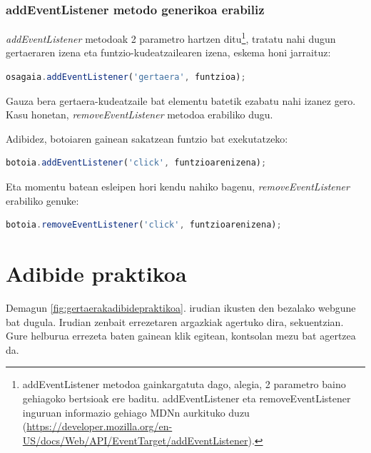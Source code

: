 \subsubsection{addEventListener metodo generikoa erabiliz}

\textit{addEventListener} metodoak 2 parametro hartzen ditu\footnote{addEventListener metodoa gainkargatuta dago, alegia, 2 parametro baino gehiagoko bertsioak ere baditu. addEventListener eta removeEventListener inguruan informazio gehiago MDNn aurkituko duzu (\href{https://developer.mozilla.org/en-US/docs/Web/API/EventTarget/addEventListener}{https://developer.mozilla.org/en-US/docs/Web/API/EventTarget/addEventListener}).}, tratatu nahi dugun gertaeraren izena eta funtzio-kudeatzailearen izena, eskema honi jarraituz:

\begin{lstlisting}[language=JavaScript,numbers=none]
osagaia.addEventListener('gertaera', funtzioa);
\end{lstlisting}

Gauza bera gertaera-kudeatzaile bat elementu batetik ezabatu nahi izanez gero. Kasu honetan, \textit{removeEventListener} metodoa erabiliko dugu.

Adibidez, botoiaren gainean sakatzean funtzio bat exekutatzeko:

\begin{lstlisting}[language=JavaScript,numbers=none]
botoia.addEventListener('click', funtzioarenizena);
\end{lstlisting}

Eta momentu batean esleipen hori kendu nahiko bagenu, \textit{removeEventListener} erabiliko genuke:

\begin{lstlisting}[language=JavaScript,numbers=none]
botoia.removeEventListener('click', funtzioarenizena);
\end{lstlisting}


\section{Adibide praktikoa}

Demagun \ref{fig:gertaerakadibidepraktikoa}. irudian ikusten den bezalako webgune bat dugula. Irudian zenbait errezetaren argazkiak agertuko dira, sekuentzian. Gure helburua errezeta baten gainean klik egitean, kontsolan mezu bat agertzea da.

